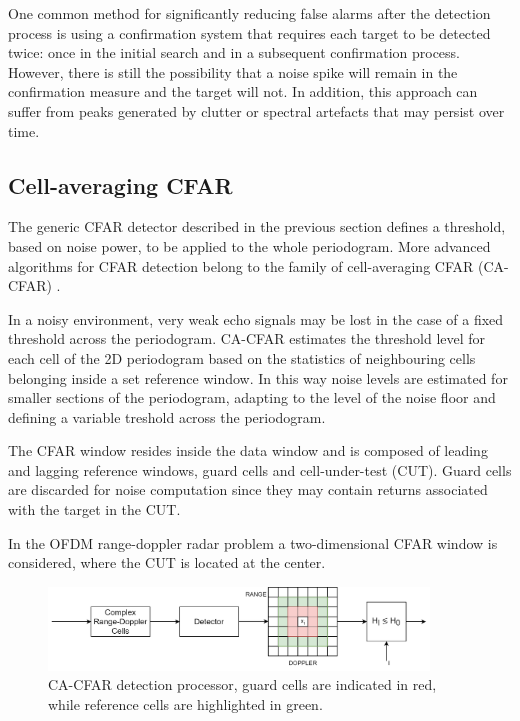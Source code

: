 			
			One common method for significantly reducing false alarms after the detection process is using a confirmation system that requires each target to be detected twice: once in the initial search and in a subsequent confirmation process.
			However, there is still the possibility that a noise spike will remain in the confirmation measure and the target will not. In addition, this approach can suffer from peaks generated by clutter or spectral artefacts that may persist over time.

		\subsection{Cell-averaging CFAR}
		\label{sec:cell averaging CFAR}

The generic CFAR detector described in the previous section defines a threshold, based on noise power, to be applied to the whole periodogram. More advanced algorithms for CFAR detection belong to the family of cell-averaging CFAR (CA-CFAR) \cite{Richards_2014}.

In a noisy environment, very weak echo signals may be lost in the case of a fixed threshold across the periodogram. CA-CFAR estimates the threshold level for each cell of the 2D periodogram based on the statistics of neighbouring cells belonging inside a set reference window. In this way noise levels are estimated for smaller sections of the periodogram, adapting to the level of the noise floor and defining a variable treshold across the periodogram.

The CFAR window resides inside the data window and is composed of leading and lagging reference windows, guard cells and cell-under-test (CUT). Guard cells are discarded for noise computation since they may contain returns associated with the target in the CUT.

In the OFDM range-doppler radar problem a two-dimensional CFAR window is considered, where the CUT is located at the center.

\begin{figure}[H]
	\centering
	\includegraphics[width=0.9\textwidth]{Images/radar_detect_threshold/cacfar_pipeline.png}
	\caption{CA-CFAR detection processor, guard cells are indicated in red, while reference cells are highlighted in green.}
	\label{fig:cacfar_pipeline}
\end{figure}


